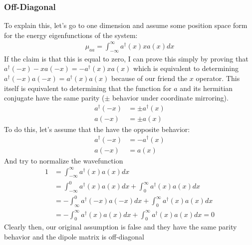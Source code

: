 \subsubsection{Off-Diagonal}
To explain this, let's go to one dimension and assume some position space form for the energy eigenfunctions of the system:
\begin{align}
	\mu_{aa} = \int_{-\infty}^{\infty} a^{\dagger}(x) x a(x) dx
\end{align}
If the claim is that this is equal to zero, I can prove this simply by proving that $a^{\dagger}(-x) -x a(-x) = -a^{\dagger}(x) x a(x)$ which is equivalent  to determining $a^{\dagger}(-x) a(-x) = a^{\dagger}(x) a(x)$ because of our friend the $x$ operator.  This itself is equivalent to determining that the function for $a$ and its hermitian conjugate have the same parity ($\pm$ behavior under coordinate mirroring).
\begin{align}
	a^{\dagger}(-x)  &= \pm a^{\dagger}(x)  \\
	a(-x) &= \pm a(x)
\end{align}
To do this, let's assume that the have the opposite behavior:
\begin{align}
	a^{\dagger}(-x)  &= - a^{\dagger}(x)  \\
	a(-x) &=  a(x)
\end{align}
And try to normalize the wavefunction
\begin{align}
	1 &= \int_{-\infty}^{\infty} a^{\dagger}(x) a(x) dx \\
		&= \int_{-\infty}^{0} a^{\dagger}(x) a(x) dx + \int_{0}^{\infty} a^{\dagger}(x) a(x) dx \\
		&= -\int_{\infty}^{0} a^{\dagger}(-x) a(-x) dx + \int_{0}^{\infty} a^{\dagger}(x) a(x) dx \\
		&= -\int_{0}^{\infty} a^{\dagger}(x) a(x) dx + \int_{0}^{\infty} a^{\dagger}(x) a(x) dx  = 0
\end{align}
Clearly then, our original assumption is false and they have the same parity behavior and the dipole matrix is off-diagonal

